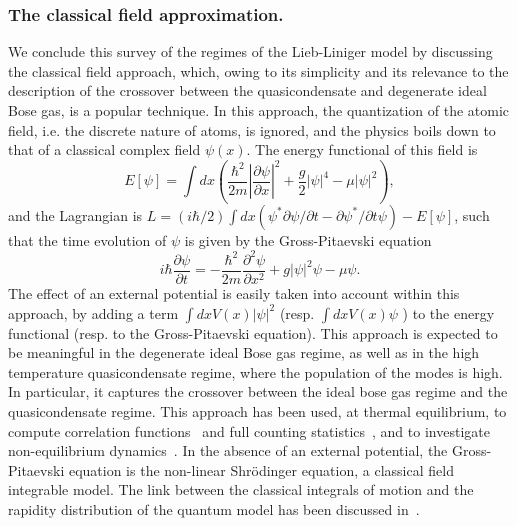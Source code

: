 \documentclass[onecolumn,amsfonts,showpacs,superscriptaddress]{revtex4-1}
\begin{document}
\subsubsection{The classical field approximation.}
\label{subsubsec:classicalfield}
We conclude this survey of the regimes of the Lieb-Liniger model by discussing  the 
classical field approach, which, owing to its simplicity and its relevance to the description of the crossover between the quasicondensate and degenerate ideal Bose gas, is a popular technique. In this approach, the quantization of the atomic field, i.e. the discrete nature of atoms, is ignored, and the physics boils down to that of a classical complex field $\psi(x)$. The energy functional of this field is 
\begin{equation}
    E[\psi]=\int dx \left 
    (
    \frac{\hbar^2}{2m}\left | \frac{\partial \psi}{\partial x} \right |^2 + \frac{g}{2} |\psi|^4 - \mu |\psi|^2
    \right ),
\end{equation}
and the Lagrangian is $L=(i\hbar/2)\int dx (\psi^* \partial \psi/\partial t -\partial \psi^*/\partial t\psi)-E[\psi]$, such that the time evolution of $\psi$ is given by the Gross-Pitaevski equation
\begin{equation}
    i\hbar \frac{\partial \psi}{\partial t} = -\frac{\hbar^2}{2m} \frac{\partial^2 \psi}{\partial x^2} +g |\psi|^2\psi -\mu \psi.
\end{equation} 
The effect of an external potential is easily taken into account within this approach, by adding a term $\int dx V(x) |\psi|^2$ (resp. $\int dx V(x) \psi$ ) to the energy functional (resp. to the Gross-Pitaevski equation).
This approach is expected to be meaningful in the degenerate ideal Bose gas regime, as well as in the high temperature quasicondensate regime, where the population of the modes is high. In particular, it captures the crossover between the ideal bose gas regime and the quasicondensate regime. This approach has been used, at thermal equilibrium, to compute correlation functions~\citep{castin_coherence_2000,castin_simple_2004,jacqmin_momentum_2012,bouchoule_two-body_2012} and full counting statistics~\citep{arzamasovs_full_2019}, and to investigate non-equilibrium dynamics~\citep{bouchoule_finite-temperature_2016,thomas_thermalization_2021}. 
In the absence of an external potential, the Gross-Pitaevski equation is the non-linear Shr\"odinger equation, a classical field integrable model. The link between the classical integrals of motion and the rapidity distribution of the quantum model has been discussed in~\citep{vecchio_exact_2020,bettelheim2020whitham}. 
\end{document}
